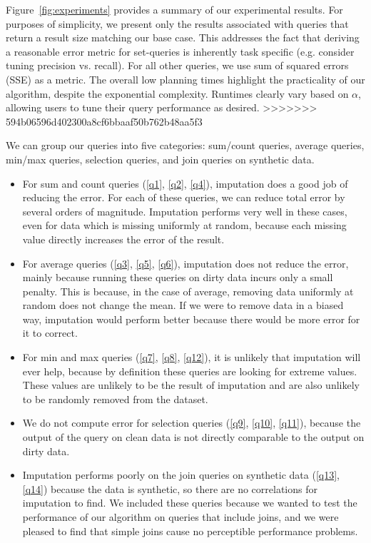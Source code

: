 Figure~\ref{fig:experiments} provides a summary of our experimental results. For purposes of simplicity, we present only the results associated with
queries that return a result size matching our base case. This addresses the fact that deriving a reasonable error metric for set-queries 
is inherently task specific (e.g. consider tuning precision vs. recall). For all other queries, we use sum of squared errors (SSE) as a metric.
The overall low planning times highlight the practicality of our algorithm, despite the exponential complexity. Runtimes clearly vary based on $\alpha$, allowing
users to tune their query performance as desired.
>>>>>>> 594b06596d402300a8cf6bbaaf50b762b48aa5f3

We can group our queries into five categories: sum/count queries, average queries, min/max queries, selection queries, and join queries on synthetic data.

\begin{itemize}
\item For sum and count queries (\ref{q1}, \ref{q2}, \ref{q4}), imputation does a good job of reducing the error.
For each of these queries, we can reduce total error by several orders of magnitude.
Imputation performs very well in these cases, even for data which is missing uniformly at random, because each missing value directly increases the error of the result.

\item For average queries (\ref{q3}, \ref{q5}, \ref{q6}), imputation does not reduce the error, mainly because running these queries on dirty data incurs only a small penalty.
This is because, in the case of average, removing data uniformly at random does not change the mean.
If we were to remove data in a biased way, imputation would perform better because there would be more error for it to correct.

\item For min and max queries (\ref{q7}, \ref{q8}, \ref{q12}), it is unlikely that imputation will ever help, because by definition these queries are looking for extreme values.
These values are unlikely to be the result of imputation and are also unlikely to be randomly removed from the dataset.

\item We do not compute error for selection queries (\ref{q9}, \ref{q10}, \ref{q11}), because the output of the query on clean data is not directly comparable to the output on dirty data.

  \item Imputation performs poorly on the join queries on synthetic data (\ref{q13}, \ref{q14}) because the data is synthetic, so there are no correlations for imputation to find. We included these queries because we wanted to test the performance of our algorithm on queries that include joins, and we were pleased to find that simple joins cause no perceptible performance problems.
\end{itemize}


